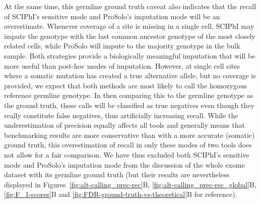 \documentclass[12pt,inline]{wlscirep}
\begin{document}
At the same time, this germline ground truth caveat also indicates that the recall of SCIPhI's sensitive mode and ProSolo's imputation mode will be an overestimate.
Whenever coverage of a site is missing in a single cell, SCIPhI may impute the genotype with the last common ancestor genotype of the most closely related cells, while ProSolo will impute to the majority genotype in the bulk sample.
Both strategies provide a biologically meaningful imputation that will be more useful than post-hoc modes of imputation.
However, at single cell sites where a somatic mutation has created a true alternative allele, but no coverage is provided, we expect that both methods are most likely to call the homozygous reference germline genotype.
In then comparing this to the germline genotype as the ground truth, these calls will be classified as true negatives even though they really constitute false negatives, thus artificially increasing recall.
While the underestimation of precision equally affects all tools and generally means that benchmarking results are more conservative than with a more accurate (somatic) ground truth, this overestimation of recall in only these modes of two tools does not allow for a fair comparison.
We have thus excluded both SCIPhI's sensitive mode and ProSolo's imputation mode from the discussion of the whole exome dataset with its germline ground truth (but their results are nevertheless displayed in Figures~\ref{fig:alt-calling_prec-rec}B, \ref{fig:alt-calling_prec-rec_global}B, \ref{fig:F_1-scores}B and \ref{fig:FDR-ground-truth-vs-theoretical}B for reference).
\end{document}
